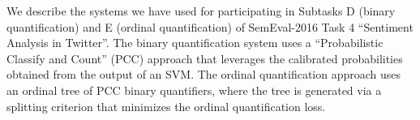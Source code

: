 We describe the systems we have used for participating in Subtasks D (binary quantification) and E (ordinal quantification) of SemEval-2016 Task 4 ``Sentiment Analysis in Twitter''. The binary quantification system uses a ``Probabilistic Classify and Count'' (PCC) approach that leverages the calibrated probabilities obtained from the output of an SVM. The ordinal quantification approach uses an ordinal tree of PCC binary quantifiers, where the tree is generated via a splitting criterion that minimizes the ordinal quantification loss.
